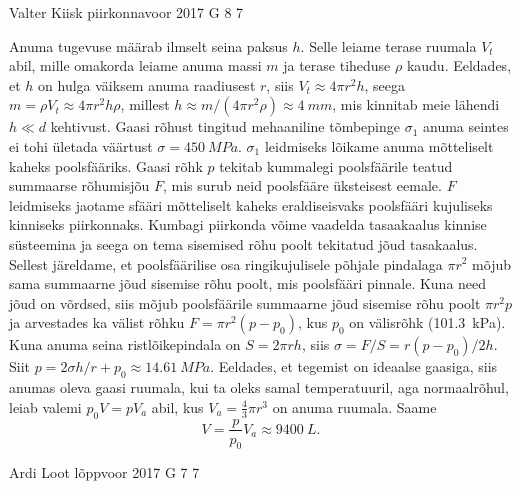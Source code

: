 \documentclass[11pt]{article}
\begin{document}
{%
{Valter Kiisk} %
{piirkonnavoor} %
{2017} %
{G 8} %
{7} %
{

\ifSolution
Anuma tugevuse määrab ilmselt seina paksus $h$. Selle leiame terase ruumala $V_t$ abil, mille omakorda leiame anuma massi $m$ ja terase tiheduse $\rho$ kaudu. Eeldades, et $h$ on hulga väiksem anuma raadiusest $r$, siis $V_t\approx4\pi r^2 h$, seega $m=\rho V_t \approx 4\pi r^2h\rho$, millest $h\approx m/(4\pi r^2\rho)\approx \SI{4}{mm}$, mis kinnitab meie lähendi $h\ll d$ kehtivust. Gaasi rõhust tingitud mehaaniline tõmbepinge $\sigma_1$ anuma seintes ei tohi ületada väärtust $\sigma=\SI{450}{MPa}$. $\sigma_1$ leidmiseks lõikame anuma mõtteliselt kaheks poolsfääriks.
Gaasi rõhk $p$ tekitab kummalegi poolsfäärile teatud summaarse rõhumisjõu $F$, mis surub neid poolsfääre üksteisest eemale. $F$ leidmiseks jaotame sfääri mõtteliselt kaheks eraldiseisvaks poolsfääri kujuliseks kinniseks piirkonnaks. Kumbagi piirkonda võime vaadelda tasaakaalus kinnise süsteemina ja seega on tema sisemised rõhu poolt tekitatud jõud tasakaalus. Sellest järeldame, et poolsfäärilise osa ringikujulisele põhjale pindalaga $\pi r^2$ mõjub sama summaarne jõud sisemise rõhu poolt, mis poolsfääri pinnale. Kuna need jõud on võrdsed, siis mõjub poolsfäärile summaarne jõud sisemise rõhu poolt $\pi r^2 p$ ja arvestades ka välist rõhku $F=\pi r^2(p-p_0)$, kus $p_0$ on välisrõhk (\SI{101.3}{kPa}). Kuna anuma seina ristlõikepindala on $S=2\pi rh$, siis $\sigma=F/S=r(p-p_0)/2h$. Siit $p=2\sigma h/r+p_0\approx \SI{14.61}{MPa}$. Eeldades, et tegemist on ideaalse gaasiga, siis anumas oleva gaasi ruumala, kui ta oleks samal temperatuuril, aga normaalrõhul, leiab valemi $p_0V=pV_a$ abil, kus $V_a=\frac{4}{3}\pi r^3$ on anuma ruumala. Saame
\[
V=\frac{p}{p_0}V_a\approx\SI{9400}{L}.
\]
\fi
}

{Ardi Loot} %
{lõppvoor} %
{2017} %
{G 7} %
{7} %
{

}}
\end{document}
